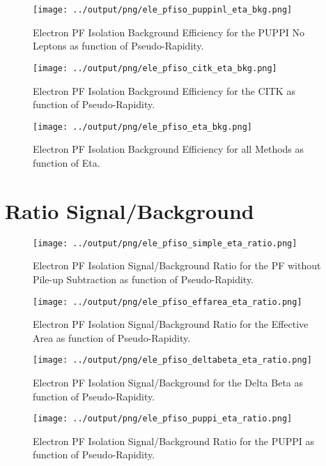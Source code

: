\documentclass[11pt]{book}
\begin{document}
\begin{figure}[htb]
\centering
\texttt{[image: ../output/png/ele\_pfiso\_puppinl\_eta\_bkg.png]}
\caption{Electron PF Isolation Background Efficiency for the PUPPI No Leptons as function of Pseudo-Rapidity.}
\label{fig:ele_pfiso_eta_bkg_puppinl}
\end{figure}

\begin{figure}[htb]
\centering
\texttt{[image: ../output/png/ele\_pfiso\_citk\_eta\_bkg.png]}
\caption{Electron PF Isolation Background Efficiency for the CITK as function of Pseudo-Rapidity.}
\label{fig:ele_pfiso_eta_bkg_citk}
\end{figure}

\begin{figure}[htb]
\centering
\texttt{[image: ../output/png/ele\_pfiso\_eta\_bkg.png]}
\caption{Electron PF Isolation Background Efficiency for all Methods as function of Eta.}
\label{fig:ele_pfiso_eta_bkg}
\end{figure}
\clearpage

\section{Ratio Signal/Background}
\begin{figure}[htb]
\centering
\texttt{[image: ../output/png/ele\_pfiso\_simple\_eta\_ratio.png]}
\caption{Electron PF Isolation Signal/Background Ratio for the PF without Pile-up Subtraction as function of Pseudo-Rapidity.}
\label{fig:ele_pfiso_eta_ratio_simple}
\end{figure}


\begin{figure}[htb]
\centering
\texttt{[image: ../output/png/ele\_pfiso\_effarea\_eta\_ratio.png]}
\caption{Electron PF Isolation Signal/Background Ratio for the Effective Area as function of Pseudo-Rapidity.}
\label{fig:ele_pfiso_eta_ratio_effarea}
\end{figure}

\begin{figure}[htb]
\centering
\texttt{[image: ../output/png/ele\_pfiso\_deltabeta\_eta\_ratio.png]}
\caption{Electron PF Isolation Signal/Background for the Delta Beta as function of Pseudo-Rapidity.}
\label{fig:ele_pfiso_eta_ratio_deltabeta}
\end{figure}

\begin{figure}[htb]
\centering
\texttt{[image: ../output/png/ele\_pfiso\_puppi\_eta\_ratio.png]}
\caption{Electron PF Isolation Signal/Background Ratio for the PUPPI as function of Pseudo-Rapidity.}
\label{fig:ele_pfiso_eta_ratio_puppi}
\end{figure}
\end{document}
